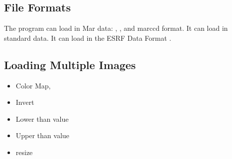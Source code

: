 \subsection{File Formats}

The program can load in Mar data: , 
, and  marccd format.
It can load in standard  data. 
It can load in the ESRF Data Format 
.


\subsection{Loading Multiple Images}


\begin{itemize}
    \item Color Map, 
    \item Invert
    \item Lower than value 
    \item Upper than value
    \item resize
\end{itemize}
